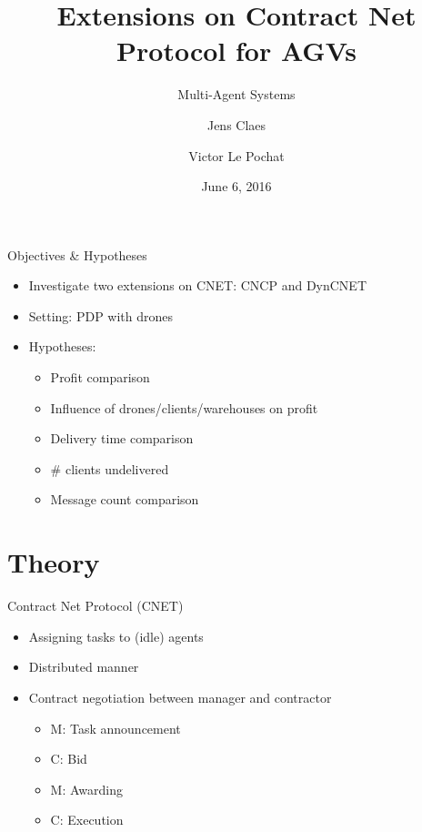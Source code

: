 \documentclass{beamer}
\title{Extensions on Contract Net Protocol for AGVs}
\subtitle{Multi-Agent Systems}
\author{Jens Claes \and Victor Le Pochat}
\date{June 6, 2016}
\begin{document}
	\frame{\titlepage}

	\begin{frame}{Objectives \& Hypotheses}
		\begin{itemize}
		\item Investigate two extensions on CNET: CNCP and DynCNET
		\item Setting: PDP with drones
		\item Hypotheses:
			\begin{itemize}
			\item Profit comparison
			\item Influence of drones/clients/warehouses on profit
			\item Delivery time comparison
			\item \# clients undelivered
			\item Message count comparison
			\end{itemize}
		\end{itemize}
	\end{frame}

	\section{Theory}
	
	\begin{frame}{Contract Net Protocol (CNET)}
		\begin{itemize}
			\item Assigning tasks to (idle) agents
			\item Distributed manner
			\item Contract negotiation between manager and contractor
			\begin{itemize}
				\item M: Task announcement
				\item C: Bid
				\item M: Awarding
				\item C: Execution
			\end{itemize}
		\end{itemize}
	\end{frame}
	
\end{document}
